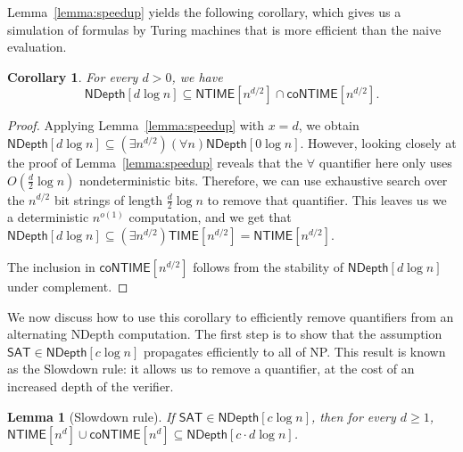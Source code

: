 \documentclass[a4paper, 11pt]{article}
\theoremstyle{plain}
\newtheorem{lemma}[theorem]{Lemma}
\newtheorem{corollary}[theorem]{Corollary}
\theoremstyle{definition}
\theoremstyle{remark}
\newcommand{\NP}{\textsf{NP}}%
\newcommand{\TIME}{\textsf{TIME}}%
\newcommand{\NTIME}{\textsf{NTIME}}%
\newcommand{\coNTIME}{\textsf{coNTIME}}%
\newcommand{\SAT}{\textsf{SAT}}%
\newcommand{\ND}{\textsf{NDepth}}%
\newcommand{\NDL}[1]{\ND\left[ #1 \log n\right]}%
\begin{document}
Lemma~\ref{lemma:speedup} yields the following corollary,
which gives us a simulation of formulas by Turing machines that is more efficient
than the naive evaluation.
\begin{corollary}\label{cor:speedup}
	For every $d > 0$, we have
	\[\NDL{d} \subseteq \NTIME[n^{d/2}] \cap \coNTIME[n^{d/2}].\]
\end{corollary}
\begin{proof}
	Applying Lemma~\ref{lemma:speedup} with $x = d$, we obtain
	$\NDL{d} \subseteq (\exists n^{d/2}) (\forall n) \NDL{0}$.
	However, looking closely at the proof of Lemma~\ref{lemma:speedup}
	reveals that the $\forall$ quantifier here only uses $O(\frac{d}{2}\log n)$
	nondeterministic bits.
	Therefore, we can use exhaustive search over the $n^{d/2}$ bit strings of length $\frac{d}{2}\log n$
	to remove that quantifier.
	This leaves us we a deterministic $n^{o(1)}$ computation, and we get that
	$\NDL{d} \subseteq (\exists n^{d/2}) \TIME[n^{d/2}] = \NTIME[n^{d/2}]$.

	The inclusion in $\coNTIME[n^{d/2}]$ follows from the stability of $\NDL{d}$
	under complement.
\end{proof}

We now discuss how to use this corollary to
efficiently remove quantifiers from an alternating \ND{} computation.
The first step is to show that the assumption $\SAT\in\NDL{c}$
propagates efficiently to all of \NP{}.
This result is known as the Slowdown rule: it allows us to remove a quantifier,
at the cost of an increased depth of the verifier.
\begin{lemma}[Slowdown rule]\label{lemma:slowdown}
	If $\SAT{}\in \NDL{c}$, then for every $d \ge 1$, $\NTIME[n^d] \cup \coNTIME[n^d] \subseteq \NDL{c\cdot d}$.
\end{lemma}
\end{document}
